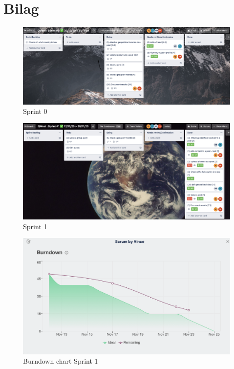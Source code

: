 \chapter{Bilag}\label{ch:bilag}

\begin{figure}
    \includegraphics[width=\linewidth]{figures/Sprint 0.png}
    \caption{Sprint 0}
    \label{fig:Sp0}
\end{figure}


\begin{figure}
    \includegraphics[width=\linewidth]{figures/Sprint 1.png}
    \caption{Sprint 1}
    \label{fig:Sp1}
\end{figure}


\begin{figure}
    \includegraphics[width=\linewidth]{figures/Sprint 1 Burndown.png}
    \caption{Burndown chart Sprint 1}
    \label{fig:Bc1}
\end{figure}



